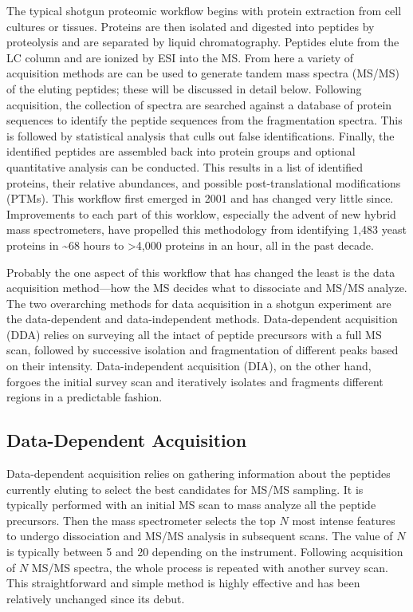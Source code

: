 The typical shotgun proteomic workflow begins with protein extraction from cell cultures or tissues. Proteins are then isolated and digested into peptides by proteolysis and are separated by liquid chromatography. Peptides elute from the LC column and are ionized by ESI into the MS. From here a variety of acquisition methods are can be used to generate tandem mass spectra (MS/MS) of the eluting peptides; these will be discussed in detail below. Following acquisition, the collection of spectra are searched against a database of protein sequences to identify the peptide sequences from the fragmentation spectra. This is followed by statistical analysis that culls out false identifications.\cite{targetdecoy} Finally, the identified peptides are assembled back into protein groups and optional quantitative analysis can be conducted. This results in a list of identified proteins, their relative abundances, and possible post-translational modifications (PTMs). This workflow first emerged in 2001 and has changed very little since.\cite{mudpit} Improvements to each part of this worklow, especially the advent of new hybrid mass spectrometers, have propelled this methodology from identifying 1,483 yeast proteins in \textasciitilde68 hours to >4,000 proteins in an hour, all in the past decade.\cite{onehour}

Probably the one aspect of this workflow that has changed the least is the data acquisition method---how the MS decides what \mz{} to dissociate and MS/MS analyze. The two overarching methods for data acquisition in a shotgun experiment are the data-dependent and data-independent methods. Data-dependent acquisition (DDA) relies on surveying all the intact \mz{} of peptide precursors with a full MS scan, followed by successive isolation and fragmentation of different \mz{} peaks based on their intensity.\cite{dda1,dda2} Data-independent acquisition (DIA), on the other hand, forgoes the initial survey scan and iteratively isolates and fragments different \mz{} regions in a predictable fashion.\cite{dia1,dia2}

\subsection*{Data-Dependent Acquisition}
Data-dependent acquisition relies on gathering information about the peptides currently eluting to select the best candidates for MS/MS sampling. It is typically performed with an initial MS scan to mass analyze all the peptide precursors. Then the mass spectrometer selects the top $N$ most intense \mz{} features to undergo dissociation and MS/MS analysis in subsequent scans. The value of $N$ is typically between 5 and 20 depending on the instrument. Following acquisition of $N$ MS/MS spectra, the whole process is repeated with another survey scan. This straightforward and simple method is highly effective and has been relatively unchanged since its debut.


